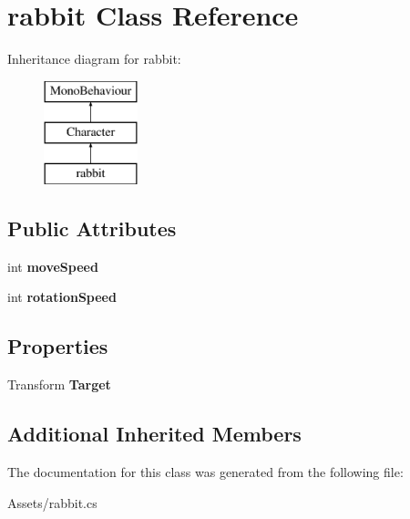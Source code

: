\hypertarget{classrabbit}{}\section{rabbit Class Reference}
\label{classrabbit}
Inheritance diagram for rabbit\+:\begin{figure}[H]
\begin{center}
\leavevmode
\includegraphics[height=3.000000cm]{classrabbit}
\end{center}
\end{figure}
\subsection*{Public Attributes}
\begin{DoxyCompactItemize}
\item 
\mbox{\label{classrabbit_a3eafc8ac14d015793b30ddf3f987f460}} 
int {\bfseries move\+Speed}
\item 
\mbox{\label{classrabbit_adbee5f933d949500c6cdeac98139a5f4}} 
int {\bfseries rotation\+Speed}
\end{DoxyCompactItemize}
\subsection*{Properties}
\begin{DoxyCompactItemize}
\item 
\mbox{\label{classrabbit_a69598d517f6349f2e88008cf10ee304f}} 
Transform {\bfseries Target}
\end{DoxyCompactItemize}
\subsection*{Additional Inherited Members}


The documentation for this class was generated from the following file\+:\begin{DoxyCompactItemize}
\item 
Assets/rabbit.\+cs\end{DoxyCompactItemize}
